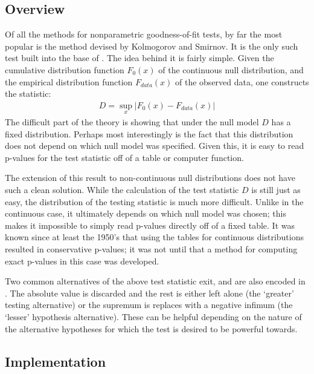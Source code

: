 \documentclass[article]{jss}
\begin{document}

\subsection{Overview}

Of all the methods for nonparametric goodness-of-fit tests, by far the most popular is the method devised by Kolmogorov and Smirnov.
It is the only such test built into the base of . The idea behind it is fairly simple. Given the cumulative distribution
function $F_0(x)$ of the continuous null distribution, and the empirical distribution function $F_{data}(x)$ of the observed data, 
one constructs the statistic:
\begin{align}
D = \sup_x \left| F_0(x)- F_{data}(x) \right|
\end{align}
The difficult part of the theory is showing that under the null model $D$ has a fixed distribution. Perhaps most interestingly is the fact 
that this distribution does not depend on which null model was specified. Given this, it is easy to read p-values for the test statistic 
off of a table or computer function.

The extension of this result to non-continuous null distributions does not have such a clean solution. While the calculation of
the test statistic $D$ is still just as easy, the distribution of the testing statistic is much more difficult. Unlike in the 
continuous case, it ultimately depends on which null model was chosen; this makes it impossible to simply read p-values directly 
off of a fixed table. It was known since at least the 1950's that using the tables for continuous distributions resulted in 
conservative p-values; it was not until \citet{Conover1972} that a method for computing exact p-values in this case was developed.

Two common alternatives of the above test statistic exit, and are also encoded in . The absolute value is discarded and the rest is either
left alone (the `greater' testing alternative) or the supremum is replaces with a negative infimum (the `lesser' hypothesis alternative). These can
be helpful depending on the nature of the alternative hypotheses for which the test is desired to be powerful towards. 

\subsection{Implementation}
\end{document}
